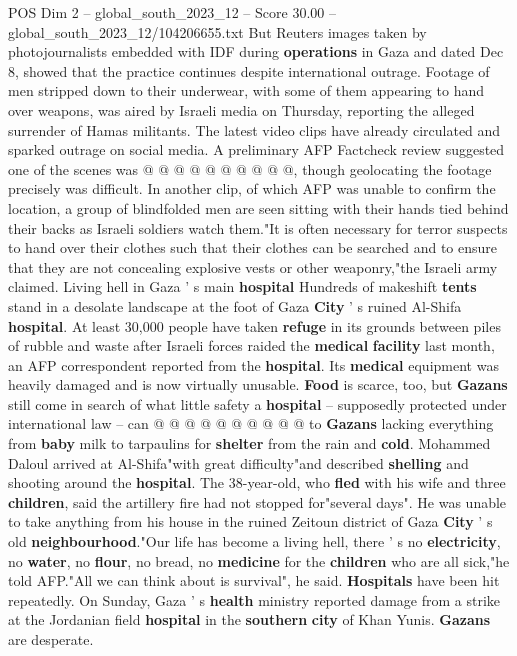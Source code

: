 \begin{textsample}{POS Dim 2 – global\_south\_2023\_12 – Score 30.00 – global\_south\_2023\_12/104206655.txt}
But Reuters images taken by photojournalists embedded with IDF during \textbf{operations} in Gaza and dated Dec 8, showed that the practice continues despite international outrage.
Footage of men stripped down to their underwear, with some of them appearing to hand over weapons, was aired by Israeli media on Thursday, reporting the alleged surrender of Hamas militants.
The latest video clips have already circulated and sparked outrage on social media.
A preliminary AFP Factcheck review suggested one of the scenes was @ @ @ @ @ @ @ @ @ @, though geolocating the footage precisely was difficult.
In another clip, of which AFP was unable to confirm the location, a group of blindfolded men are seen sitting with their hands tied behind their backs as Israeli soldiers watch them."It is often necessary for terror suspects to hand over their clothes such that their clothes can be searched and to ensure that they are not concealing explosive vests or other weaponry,"the Israeli army claimed.
Living hell in Gaza ' s main \textbf{hospital} Hundreds of makeshift \textbf{tents} stand in a desolate landscape at the foot of Gaza \textbf{City} ' s ruined Al-Shifa \textbf{hospital}.
At least 30,000 people have taken \textbf{refuge} in its grounds between piles of rubble and waste after Israeli forces raided the \textbf{medical} \textbf{facility} last month, an AFP correspondent reported from the \textbf{hospital}.
Its \textbf{medical} equipment was heavily damaged and is now virtually unusable. \textbf{Food} is scarce, too, but \textbf{Gazans} still come in search of what little safety a \textbf{hospital} -- supposedly protected under international law -- can @ @ @ @ @ @ @ @ @ @ to \textbf{Gazans} lacking everything from \textbf{baby} milk to tarpaulins for \textbf{shelter} from the rain and \textbf{cold}.
Mohammed Daloul arrived at Al-Shifa"with great difficulty"and described \textbf{shelling} and shooting around the \textbf{hospital}.
The 38-year-old, who \textbf{fled} with his wife and three \textbf{children}, said the artillery fire had not stopped for"several days".
He was unable to take anything from his house in the ruined Zeitoun district of Gaza \textbf{City} ' s old \textbf{neighbourhood}."Our life has become a living hell, there ' s no \textbf{electricity}, no \textbf{water}, no \textbf{flour}, no bread, no \textbf{medicine} for the \textbf{children} who are all sick,"he told AFP."All we can think about is survival", he said. \textbf{Hospitals} have been hit repeatedly.
On Sunday, Gaza ' s \textbf{health} ministry reported damage from a strike at the Jordanian field \textbf{hospital} in the \textbf{southern} \textbf{city} of Khan Yunis. \textbf{Gazans} are desperate.

\end{textsample}
